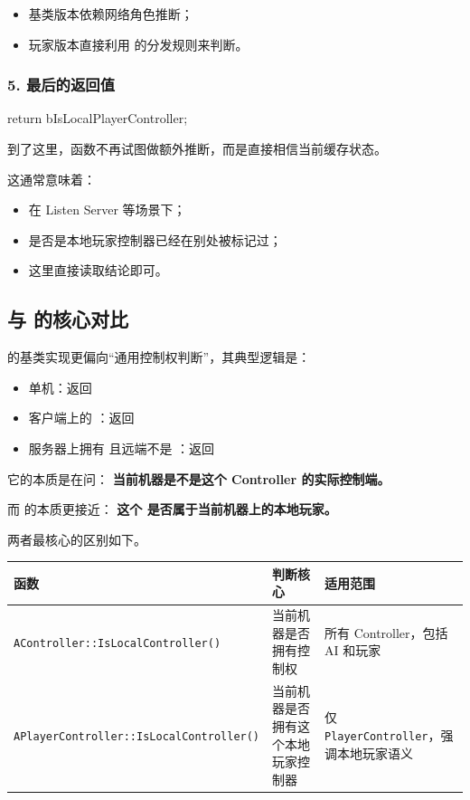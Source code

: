 \begin{itemize}
	\item 基类版本依赖网络角色推断；
	\item 玩家版本直接利用  的分发规则来判断。
\end{itemize}

\subsubsection*{5. 最后的返回值}

\begin{code}
	return bIsLocalPlayerController;
\end{code}

到了这里，函数不再试图做额外推断，而是直接相信当前缓存状态。

这通常意味着：

\begin{itemize}
	\item 在 Listen Server 等场景下；
	\item 是否是本地玩家控制器已经在别处被标记过；
	\item 这里直接读取结论即可。
\end{itemize}

\subsection{与  的核心对比}

 的基类实现更偏向“通用控制权判断”，其典型逻辑是：

\begin{itemize}
	\item 单机：返回 
	\item 客户端上的 ：返回 
	\item 服务器上拥有  且远端不是 ：返回 
\end{itemize}

它的本质是在问：	\textbf{当前机器是不是这个 Controller 的实际控制端。}

而  的本质更接近：
\textbf{这个  是否属于当前机器上的本地玩家。}

两者最核心的区别如下。

\begin{center}\footnotesize
	\renewcommand{\arraystretch}{1.5}
	\begin{tabular}{|p{6cm}|p{5.1cm}|p{5.1cm}|}
		\hline
		\textbf{函数} & \textbf{判断核心} & \textbf{适用范围} \\
		\hline
		\texttt{AController::IsLocalController()} & 当前机器是否拥有控制权 & 所有 Controller，包括 AI 和玩家 \\
		\hline
		\texttt{APlayerController::IsLocalController()} & 当前机器是否拥有这个本地玩家控制器 & 仅 \texttt{PlayerController}，强调本地玩家语义 \\
		\hline
	\end{tabular}
\end{center}

